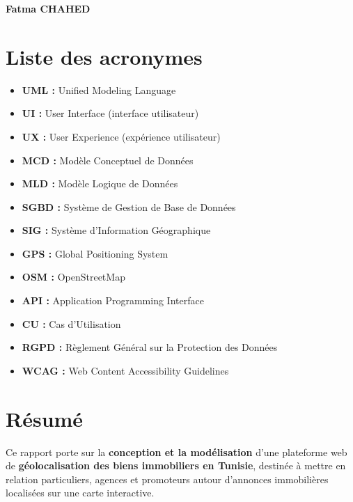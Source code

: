 \documentclass[a4paper, 12pt]{report}
\newcommand{\Etudiante}{Fatma CHAHED} %
\begin{document}
\begin{flushright}
\textbf{\Etudiante}
\end{flushright}

\renewcommand{\contentsname}{Table des matières}
\tableofcontents

\renewcommand{\listfigurename}{Table des figures}
\listoffigures

\renewcommand{\listtablename}{Liste des tableaux}
\listoftables

\newpage
\section*{ \centering Liste des acronymes}
\begin{itemize}
    \item[--] \textbf{UML :} Unified Modeling Language
    \item[--] \textbf{UI :} User Interface (interface utilisateur)
    \item[--] \textbf{UX :} User Experience (expérience utilisateur)
    \item[--] \textbf{MCD :} Modèle Conceptuel de Données
    \item[--] \textbf{MLD :} Modèle Logique de Données
    \item[--] \textbf{SGBD :} Système de Gestion de Base de Données
    \item[--] \textbf{SIG :} Système d'Information Géographique
    \item[--] \textbf{GPS :} Global Positioning System
    \item[--] \textbf{OSM :} OpenStreetMap
    \item[--] \textbf{API :} Application Programming Interface
    \item[--] \textbf{CU :} Cas d'Utilisation
    \item[--] \textbf{RGPD :} Règlement Général sur la Protection des Données
    \item[--] \textbf{WCAG :} Web Content Accessibility Guidelines
\end{itemize}
\newpage

\newpage
\section*{\centering Résumé}
Ce rapport porte sur la \textbf{conception et la modélisation} d'une plateforme web
de \textbf{géolocalisation des biens immobiliers en Tunisie}, destinée à mettre en
relation particuliers, agences et promoteurs autour d'annonces immobilières
localisées sur une carte interactive.
\end{document}
